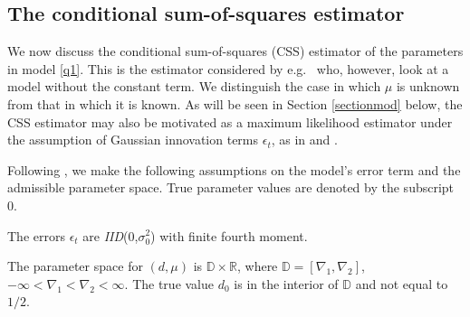 {{\subsection{The conditional sum-of-squares estimator} \label{subsect22}

We now discuss the conditional sum-of-squares (CSS) estimator of the parameters in model \eqref{q1}. This is the estimator considered by e.g.\ \textcite{hualde2011gaussian} who, however, look at a model without the constant term. We
distinguish the case in which $\mu$ is unknown from that in which it is known. As will be seen in Section \ref{sectionmod} below, the CSS estimator may also be motivated as a maximum likelihood estimator under the
assumption of Gaussian innovation terms $\epsilon_t$, as in \textcite{johansen2016role} and \textcite{hualde2020truncated}.

Following \textcite{johansen2016role}, we make the following assumptions on the model's error term and the admissible parameter space. True parameter values are denoted by the subscript 0.
\begin{assumption}\label{a1}
The errors $\epsilon_t$ are \textit{IID}(0,$\sigma_0^2$) with finite fourth moment.
\end{assumption}
\begin{assumption}\label{a2}
The parameter space for $(d,\mu)$ is $ \mathbb{D} \times \mathbb{R}$, where
$ \mathbb{D} = [\nabla_1,\nabla_2]$, $ -\infty < \nabla_1  <  \nabla_2 < \infty$. The true value $d_0$ is in the interior of $\mathbb{D}$ and not equal to $1/2$. 
\end{assumption}

}}
